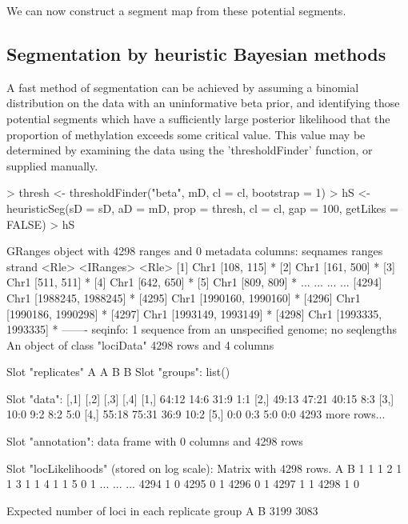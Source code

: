 \documentclass[a4paper]{article}
\begin{document}
We can now construct a segment map from these potential segments.

\subsection*{Segmentation by heuristic Bayesian methods}

A fast method of segmentation can be achieved by assuming a binomial distribution on the data with an uninformative beta prior, and identifying those potential segments which have a sufficiently large posterior likelihood that the proportion of methylation exceeds some critical value. This value may be determined by examining the data using the 'thresholdFinder' function, or supplied manually.

\begin{Schunk}
\begin{Sinput}
> thresh <- thresholdFinder("beta", mD, cl = cl, bootstrap = 1)
> hS <- heuristicSeg(sD = sD, aD = mD, prop = thresh, cl = cl, gap = 100, getLikes = FALSE)
> hS
\end{Sinput}
\begin{Soutput}
GRanges object with 4298 ranges and 0 metadata columns:
         seqnames             ranges strand
            <Rle>          <IRanges>  <Rle>
     [1]     Chr1         [108, 115]      *
     [2]     Chr1         [161, 500]      *
     [3]     Chr1         [511, 511]      *
     [4]     Chr1         [642, 650]      *
     [5]     Chr1         [809, 809]      *
     ...      ...                ...    ...
  [4294]     Chr1 [1988245, 1988245]      *
  [4295]     Chr1 [1990160, 1990160]      *
  [4296]     Chr1 [1990186, 1990298]      *
  [4297]     Chr1 [1993149, 1993149]      *
  [4298]     Chr1 [1993335, 1993335]      *
  -------
  seqinfo: 1 sequence from an unspecified genome; no seqlengths
An object of class "lociData"
4298 rows and 4 columns

Slot "replicates"
A A B B
Slot "groups":
list()

Slot "data":
     [,1]  [,2]  [,3]  [,4]
[1,] 64:12 14:6  31:9  1:1 
[2,] 49:13 47:21 40:15 8:3 
[3,] 10:0  9:2   8:2   5:0 
[4,] 55:18 75:31 36:9  10:2
[5,] 0:0   0:3   5:0   0:0 
4293 more rows...

Slot "annotation":
data frame with 0 columns and 4298 rows

Slot "locLikelihoods" (stored on log scale):
Matrix with  4298  rows.
       A   B
1      1   1
2      1   1
3      1   1
4      1   1
5      0   1
...  ... ...
4294   1   0
4295   0   1
4296   0   1
4297   1   1
4298   1   0

Expected number of loci in each replicate group
   A    B 
3199 3083 
\end{Soutput}
\end{Schunk}
\end{document}
